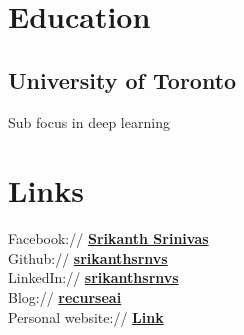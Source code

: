 \documentclass[]{deedy-resume-openfont}
\begin{document}
%
%
\lastupdated

%
%

%
%

\begin{minipage}[t]{0.33\textwidth} 


\section{Education} 

\subsection{University of Toronto}
Sub focus in deep learning
\sectionsep


\section{Links} 
Facebook:// \href{https://www.facebook.com/IamGingerTrash}{\bf Srikanth Srinivas} \\
Github:// \href{https://github.com/srikanthsrnvs}{\bf srikanthsrnvs} \\
LinkedIn://  \href{https://www.linkedin.com/in/srikanthsrnvs/}{\bf srikanthsrnvs} \\
Blog://  \href{https://medium.com/@recurseai}{\bf recurseai} \\
Personal website://  \href{https://srikanthsrnvs.github.io/website/}{\bf Link} \\



\end{minipage}
\end{document}
